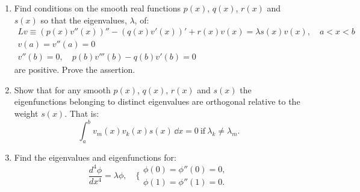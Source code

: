 {%
\begin{Exercise}
  \label{exercise pv''''-qv''+rv=lsv}
  \begin{enumerate}
  \item
    Find conditions on the smooth real functions $p(x)$, $q(x)$, $r(x)$ and 
    $s(x)$ so that the eigenvalues, $\lambda$, of:
    \begin{gather*}
      L v \equiv (p(x) v''(x))'' - (q(x) v'(x))' + r(x) v(x) = \lambda s(x) v(x),
      \quad a < x < b \\
      v(a) = v''(a) = 0 \\
      v''(b) = 0, \quad p(b) v'''(b) - q(b) v'(b) = 0
    \end{gather*}
    are positive.  Prove the assertion.
  \item
    Show that for any smooth $p(x)$, $q(x)$, $r(x)$ and $s(x)$ the eigenfunctions
    belonging to distinct eigenvalues are orthogonal relative to the weight 
    $s(x)$.  That is:
    \[
    \int_a^b v_m(x) v_k(x) s(x) \,\dd x = 0\ \mathrm{if}\ \lambda_k \neq \lambda_m.
    \]
  \item
    Find the eigenvalues and eigenfunctions for:
    \[
    \frac{d^4 \phi}{d x^4} = \lambda \phi, \quad
    \Big\{
    \begin{matrix}
      \phi(0) = \phi''(0) = 0, \\
      \phi(1) = \phi''(1) = 0.
    \end{matrix}
    \]
  \end{enumerate}

\end{Exercise}










\raggedbottom
}
